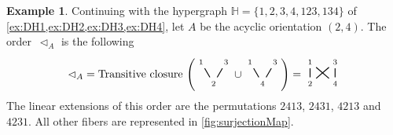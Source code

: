 \documentclass{amsart}
\theoremstyle{definition}
\newtheorem{example}[theorem]{Example}
\newcommand{\less}{\vartriangleleft} %
\newcommand{\HH}{\mathbb H}  %
\begin{document}
\begin{example}
\label{ex:DH5}
Continuing with the hypergraph $\HH=\{ 1, 2, 3, 4, 123, 134 \}$ of \cref{ex:DH1,ex:DH2,ex:DH3,ex:DH4}, let $A$ be the acyclic orientation $(2,4)$.
The order~$\less_A$ is the following
\[
	{\less_A} = \text{Transitive closure }\Bigg(
	\begin{tikzpicture}[scale=1,baseline=.2cm]
		\node (2) at (0,0) {$\scriptstyle 2$};
		\node (1) at (-.4,.7) {$\scriptstyle 1$};
		\node (3) at (.4,.7) {$\scriptstyle 3$};
		\draw [thick] (2)--(1); 
		\draw [thick] (2)--(3); 
	\end{tikzpicture} 
	\cup
	\begin{tikzpicture}[scale=1,baseline=.2cm]
		\node (4) at (0,0) {$\scriptstyle 4$};
		\node (1) at (-.4,.7) {$\scriptstyle 1$};
		\node (3) at (.4,.7) {$\scriptstyle 3$};
		\draw [thick] (4)--(1); 
		\draw [thick] (4)--(3); 
	\end{tikzpicture} 
	\Bigg)
	=
	\begin{tikzpicture}[scale=1,baseline=.2cm]
		\node (4) at (.4,0) {$\scriptstyle 4$};
		\node (2) at (-.4,0) {$\scriptstyle 2$};
		\node (1) at (-.4,.7) {$\scriptstyle 1$};
		\node (3) at (.4,.7) {$\scriptstyle 3$};
		\draw [thick] (4)--(1); 
		\draw [thick] (4)--(3); 
		\draw [thick] (2)--(1); 
		\draw [thick] (2)--(3); 
	\end{tikzpicture} 	
\]
The linear extensions of this order are the permutations $2413$, $2431$, $4213$ and $4231$.
All other fibers are represented in \cref{fig:surjectionMap}.


\end{example}
\end{document}
